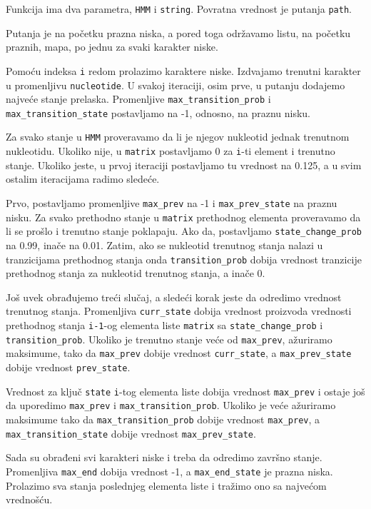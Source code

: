Funkcija ima dva parametra, \texttt{HMM} i \texttt{string}. Povratna vrednost je putanja \texttt{path}.

Putanja je na početku prazna niska, a pored toga održavamo listu, na početku praznih, mapa, po jednu za svaki karakter niske. 

Pomoću indeksa \texttt{i} redom prolazimo karaktere niske. Izdvajamo trenutni karakter u promenljivu \texttt{nucleotide}. U svakoj iteraciji, osim prve, u putanju dodajemo najveće stanje prelaska. Promenljive \texttt{max\_transition\_prob} i \texttt{max\_transition\_state} postavljamo na -1, odnosno, na praznu nisku.

Za svako stanje u \texttt{HMM} proveravamo da li je njegov nukleotid jednak trenutnom nukleotidu. Ukoliko nije, u \texttt{matrix} postavljamo 0 za \texttt{i}-ti element i trenutno stanje. Ukoliko jeste, u prvoj iteraciji postavljamo tu vrednost na 0.125, a u svim ostalim iteracijama radimo sledeće.

Prvo, postavljamo promenljive \texttt{max\_prev} na -1 i \texttt{max\_prev\_state} na praznu nisku. Za svako prethodno stanje u \texttt{matrix} prethodnog elementa proveravamo da li se prošlo i trenutno stanje poklapaju. Ako da, postavljamo \texttt{state\_change\_prob} na 0.99, inače na 0.01. Zatim, ako se nukleotid trenutnog stanja nalazi u tranzicijama prethodnog stanja onda \texttt{transition\_prob} dobija vrednost tranzicije prethodnog stanja za nukleotid trenutnog stanja, a inače 0.

Još uvek obrađujemo treći slučaj, a sledeći korak jeste da odredimo vrednost trenutnog stanja. Promenljiva \texttt{curr\_state} dobija vrednost proizvoda  vrednosti prethodnog stanja \texttt{i-1}-og elementa liste \texttt{matrix} sa \texttt{state\_change\_prob} i \texttt{transition\_prob}. Ukoliko je trenutno stanje veće od \texttt{max\_prev}, ažuriramo maksimume, tako da \texttt{max\_prev} dobije vrednost \texttt{curr\_state}, a \texttt{max\_prev\_state} dobije vrednost \texttt{prev\_state}.

Vrednost za ključ \texttt{state} \texttt{i}-tog elementa liste dobija vrednost \texttt{max\_prev} i ostaje još da uporedimo \texttt{max\_prev} i \texttt{max\_transition\_prob}. Ukoliko je veće ažuriramo maksimume tako da \texttt{max\_transition\_prob} dobije vrednost \texttt{max\_prev}, a \texttt{max\_transition\_state} dobije vrednost \texttt{max\_prev\_state}.

Sada su obrađeni svi karakteri niske i treba da odredimo završno stanje. Promenljiva \texttt{max\_end} dobija vrednost -1, a \texttt{max\_end\_state} je prazna niska. Prolazimo sva stanja poslednjeg elementa liste i tražimo ono sa najvećom vrednošću.

